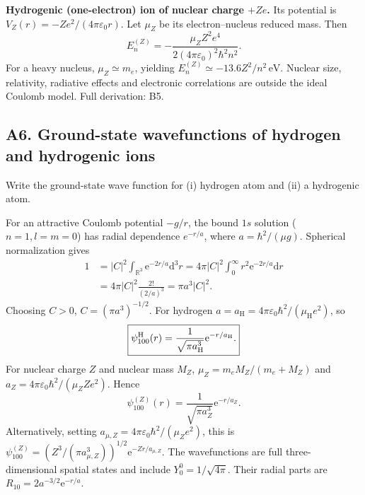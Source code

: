 \documentclass[11pt,a4paper]{article}
\newcommand{\dd}{\mathrm{d}}
\newcommand{\ee}{\mathrm{e}}
\newcommand{\R}{\mathbb R}
\newcommand{\aH}{a_{\mathrm H}}
\newcommand{\mH}{\mu_{\mathrm H}}
\newcommand{\eps}{\varepsilon_0}
\begin{document}
\textbf{Hydrogenic (one-electron) ion of nuclear charge \(+Ze\).} Its potential is \(V_Z(r)=-Ze^2/(4\pi\eps r)\). Let \(\mu_Z\) be its electron--nucleus reduced mass. Then
\begin{equation}\boxed{E_n^{(Z)}=-\frac{\mu_Z Z^2e^4}{2(4\pi\eps)^2\hbar^2n^2}.}\end{equation}
For a heavy nucleus, \(\mu_Z\simeq m_e\), yielding \(E_n^{(Z)}\simeq-13.6Z^2/n^2\,\mathrm{eV}\). Nuclear size, relativity, radiative effects and electronic correlations are outside the ideal Coulomb model. Full derivation: B5.

\subsection{A6. Ground-state wavefunctions of hydrogen and hydrogenic ions}
\begin{questionbox}Write the ground-state wave function for (i) hydrogen atom and (ii) a hydrogenic atom.\end{questionbox}
For an attractive Coulomb potential \(-g/r\), the bound \(1s\) solution (\(n=1,l=m=0\)) has radial dependence \(e^{-r/a}\), where \(a=\hbar^2/(\mu g)\). Spherical normalization gives
\begin{align}
1&=|C|^2\int_{\R^3}\ee^{-2r/a}\dd^3r=4\pi|C|^2\int_0^\infty r^2\ee^{-2r/a}\dd r\\
&=4\pi|C|^2\frac{2!}{(2/a)^3}=\pi a^3|C|^2.
\end{align}
Choosing \(C>0\), \(C=(\pi a^3)^{-1/2}\). For hydrogen \(a=\aH=4\pi\eps\hbar^2/(\mH e^2)\), so
\begin{equation}\boxed{\psi_{100}^{\rm H}(r)=\frac1{\sqrt{\pi\aH^3}}\ee^{-r/\aH}.}\end{equation}
For nuclear charge \(Z\) and nuclear mass \(M_Z\), \(\mu_Z=m_eM_Z/(m_e+M_Z)\) and \(a_Z=4\pi\eps\hbar^2/(\mu_ZZe^2)\). Hence
\begin{equation}\boxed{\psi_{100}^{(Z)}(r)=\frac1{\sqrt{\pi a_Z^3}}\ee^{-r/a_Z}.}\end{equation}
Alternatively, setting \(a_{\mu,Z}=4\pi\eps\hbar^2/(\mu_Z e^2)\), this is \(\psi_{100}^{(Z)}=(Z^3/(\pi a_{\mu,Z}^3))^{1/2}\ee^{-Zr/a_{\mu,Z}}\). The wavefunctions are full three-dimensional spatial states and include \(Y_0^0=1/\sqrt{4\pi}\). Their radial parts are \(R_{10}=2a^{-3/2}\ee^{-r/a}\).
\end{document}
